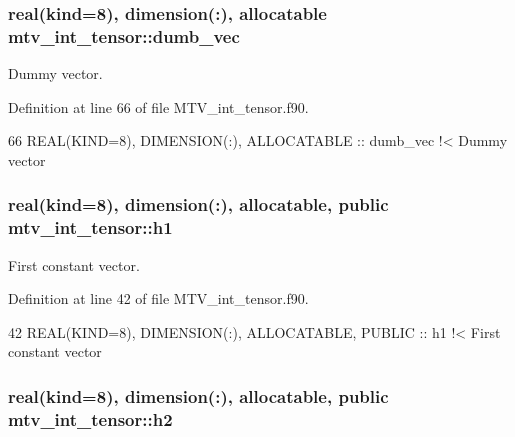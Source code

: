 \subsubsection[{\texorpdfstring{dumb\+\_\+vec}{dumb_vec}}]{\setlength{\rightskip}{0pt plus 5cm}real(kind=8), dimension(\+:), allocatable mtv\+\_\+int\+\_\+tensor\+::dumb\+\_\+vec\hspace{0.3cm}{\ttfamily [private]}}\hypertarget{namespacemtv__int__tensor_a192990600ca27522b2027f6c927572f7}{}\label{namespacemtv__int__tensor_a192990600ca27522b2027f6c927572f7}


Dummy vector. 



Definition at line 66 of file M\+T\+V\+\_\+int\+\_\+tensor.\+f90.


\begin{DoxyCode}
66   \textcolor{keywordtype}{REAL(KIND=8)}, \textcolor{keywordtype}{DIMENSION(:)}, \textcolor{keywordtype}{ALLOCATABLE} :: dumb\_vec\textcolor{comment}{ !< Dummy vector}
\end{DoxyCode}
\subsubsection[{\texorpdfstring{h1}{h1}}]{\setlength{\rightskip}{0pt plus 5cm}real(kind=8), dimension(\+:), allocatable, public mtv\+\_\+int\+\_\+tensor\+::h1}\hypertarget{namespacemtv__int__tensor_a8979293cdfe7d9e67f3348a444076f3c}{}\label{namespacemtv__int__tensor_a8979293cdfe7d9e67f3348a444076f3c}


First constant vector. 



Definition at line 42 of file M\+T\+V\+\_\+int\+\_\+tensor.\+f90.


\begin{DoxyCode}
42   \textcolor{keywordtype}{REAL(KIND=8)}, \textcolor{keywordtype}{DIMENSION(:)}, \textcolor{keywordtype}{ALLOCATABLE}, \textcolor{keywordtype}{PUBLIC} :: h1\textcolor{comment}{   !< First constant vector}
\end{DoxyCode}
\subsubsection[{\texorpdfstring{h2}{h2}}]{\setlength{\rightskip}{0pt plus 5cm}real(kind=8), dimension(\+:), allocatable, public mtv\+\_\+int\+\_\+tensor\+::h2}\hypertarget{namespacemtv__int__tensor_ad0dd8bb28d5e88e5776c48b302ae4b29}{}\label{namespacemtv__int__tensor_ad0dd8bb28d5e88e5776c48b302ae4b29}


